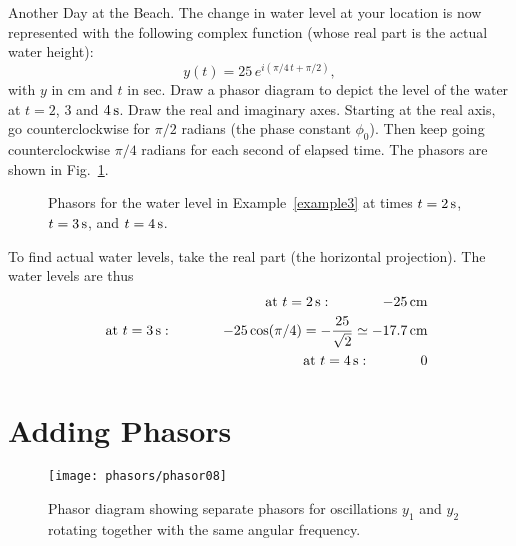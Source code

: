 \begin{example}{Another Day at the Beach.}  
\label{example3}
The change in water level at your location is now represented with
the following complex function (whose real part is the actual water
height):
\begin{equation}
y(t) = 25 \, e^{i(\pi/4\, t + \pi/2)},
\end{equation}
with $y$ in cm and $t$ in sec. 
Draw a phasor diagram to depict the level of the water at $t = 2$, 3 and 
$4\,\mbox{s}$.
\solution
Draw the real and imaginary axes.  Starting at the real axis, 
go counterclockwise for $\pi/2$ radians (the phase constant $\phi_0$).  
Then keep going counterclockwise $\pi/4$ radians for each second of 
elapsed time.  The phasors are shown in Fig.~\ref{fig:phasorRotation}.

\begin{figure}
\begin{center}
\caption{\label{fig:phasorRotation}Phasors for the water level in 
Example~\ref{example3} at times $t=2\,\mbox{s}$, $t=3\,\mbox{s}$, and 
$t=4\,\mbox{s}$.}
\end{center}
\end{figure}
To find actual water levels, take the real part (the horizontal projection).  
The water levels are thus   
\begin{eqnarray}
&&\mbox{at $t=2\,\mbox{s}$}: \hspace{0.5in}-25\,\mbox{cm}\nonumber \\
&&\mbox{at $t=3\,\mbox{s}$}: \hspace{0.5in}-25\cos(\pi/4)= 
  -\frac{25}{\sqrt{2}}\simeq-17.7\,\mbox{cm}\nonumber\\ 
&&\mbox{at $t=4\,\mbox{s}$}:\hspace{0.5in}0\nonumber
\end{eqnarray}
\end{example}

\section{Adding Phasors}
\begin{figure}[b]
\begin{center}
\texttt{[image: phasors/phasor08]} 
\caption{\label{fig:phasor08}Phasor diagram showing separate phasors 
for oscillations $y_1$ and $y_2$ rotating together with the 
same angular frequency.}
\end{center}
\end{figure}
%

